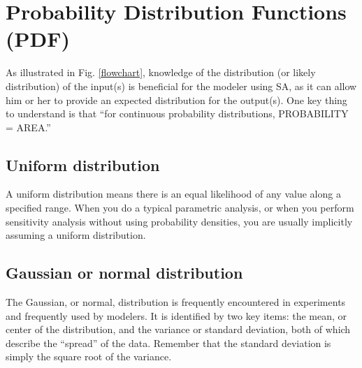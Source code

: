 \documentclass[10pt]{article}
\begin{document}
\section{Probability Distribution Functions (PDF)}

As illustrated in Fig. \ref{flowchart}, knowledge of the distribution (or likely distribution) of the input(s) is beneficial for the modeler using SA, as it can allow him or her to provide an expected distribution for the output(s). One key thing to understand is that ``for continuous probability distributions, PROBABILITY = AREA.'' \cite{Illowsky2014-stats}







\subsection{Uniform distribution}

A uniform distribution means there is an equal likelihood of any value along a specified range. When you do a typical parametric analysis, or when you perform sensitivity analysis without using probability densities, you are usually implicitly assuming a uniform distribution.


\subsection{Gaussian or normal distribution}  \label{stats}

The Gaussian, or normal, distribution is frequently encountered in experiments and frequently used by modelers. It is identified by two key items: the mean, or center of the distribution, and the variance or standard deviation, both of which describe the ``spread'' of the data. Remember that the standard deviation is simply the square root of the variance.
\end{document}
